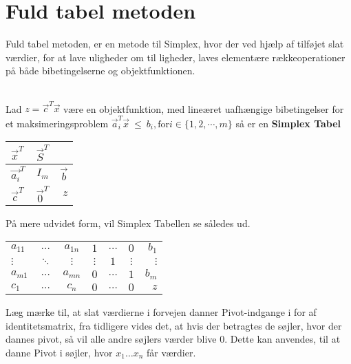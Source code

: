 \section{Fuld tabel metoden}
Fuld tabel metoden, er en metode til Simplex, hvor der ved hjælp af tilføjet slat værdier, for at lave uligheder om til ligheder, laves elementære rækkeoperationer på både bibetingelserne og objektfunktionen.\\
\\
\begin{defn}
Lad $z=\vec{c}^T\vec{x}$ være en objektfunktion, med lineæret uafhængige bibetingelser for et maksimeringsproblem $	\vec{a}_i^T\vec{x} \ \leq \  b_i, \text{for} i \in \{1,2,\cdots, m\}$ så er en \textbf{Simplex Tabel}\\
\begin{center}
\begin{tabular}{| l | c | r |}
  \hline
  $\vec{x}^T$&$\vec{S}^T$& \\ \hline			
  $\vec{a_i}^T$ & $I_m$ & $\vec{b}$ \\ \hline
  $\vec{c}^T$ & $\vec{0}^T$ & $z$ \\
  \hline  
\end{tabular}
\end{center}
\end{defn}
På mere udvidet form, vil Simplex Tabellen se således ud.
\begin{center}
\begin{tabular}{| l  c  c | c  c  c |r |}
  \hline			
  $a_{1 1}$ & $\dots$ & $a_{1 n}$ & $1$ & $\dots$ & $0$ & $b_1$\\
  $\vdots$ & $\ddots$ & $\vdots$ & $\vdots$ & $1$ & $\vdots$ & $\vdots$\\
  $a_{m 1}$ & $\dots$ & $a_{m n}$ & $0$ & $\dots$ & $1$ & $b_m$\\ \hline
  $c_1$ & $\dots$ & $c_n$ & $0$ & $\dots$ & $0$ & $z$ \\ \hline  
\end{tabular}
\end{center}
Læg mærke til, at slat værdierne i forvejen danner Pivot-indgange i for af identitetsmatrix, fra tidligere vides det, at hvis der betragtes de søjler, hvor der dannes pivot, så vil alle andre søjlers værder blive $0$. Dette kan anvendes, til at danne Pivot i søjler, hvor $x_1\dots x_n$ får værdier.\\
